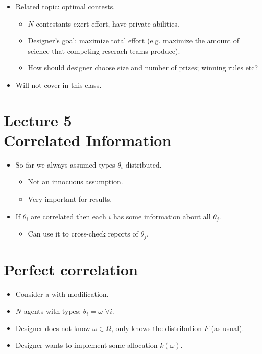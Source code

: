 \documentclass[english,handout,10pt]{beamer}		%
\def\lyxframeend{} %
\begin{document}
\begin{itemize}
	\item Related topic: optimal contests.
	\begin{itemize}
		\item $N$ contestants exert effort, have private abilities.
		\item Designer's goal: maximize total effort (e.g. maximize the amount of science that competing reserach teams produce).
		\item How should designer choose size and number of prizes; winning rules etc? 
	\end{itemize}
	\item Will not cover in this class.
\end{itemize}
\lyxframeend





\section{Lecture 5 \\ Correlated Information}

\begin{itemize}
	\item So far we always assumed types $\theta_i$  distributed.
	\begin{itemize}
		\item Not an innocuous assumption.
		\item Very important for results.
	\end{itemize}
	\item If $\theta_i$ are correlated then each $i$ has some information about all $\theta_j$.
	\begin{itemize}
		\item Can use it to cross-check reports of $\theta_j$.
	\end{itemize}
\end{itemize}
\lyxframeend


\section{Perfect correlation}

\begin{itemize}
	\item Consider a  with modification.
	\item $N$ agents with  types: $\theta_i = \omega$ $\forall i$.
	\item Designer does not know $\omega \in \Omega$, only knows the distribution $F$ (as usual).
	\item Designer wants to implement some allocation $k(\omega)$.
\end{itemize}
\lyxframeend
\end{document}
